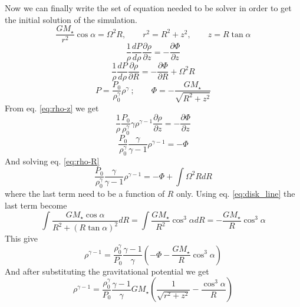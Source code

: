 \documentclass[12pt, a4paper]{article}
\begin{document}
Now we can finally write the set of equation needed to be solver in order to get the initial solution of the simulation.
\begin{equation}\label{eq:disk_line}
    \frac{G M_\star}{r^2}\cos\alpha = \Omega^2 R, \qquad r^2=R^2+z^2, \qquad z=R\tan\alpha
\end{equation}
\begin{equation}\label{eq:rho-z}
    \frac{1}{\rho}\frac{d P}{d \rho}\frac{\partial \rho}{\partial z} = -\frac{\partial \Phi}{\partial z}
\end{equation}
\begin{equation}\label{eq:rho-R}
    \frac{1}{\rho}\frac{d P}{d \rho}\frac{\partial \rho}{\partial R} = -\frac{\partial \Phi}{\partial R} + \Omega^2 R
\end{equation}
\begin{equation}
    P=\frac{P_0}{\rho_0^\gamma}\rho^\gamma ~;\qquad \Phi=-\frac{G M_\star}{\sqrt{R^2+z^2}} 
\end{equation}
From eq. \ref{eq:rho-z} we get
\begin{equation}
    \frac{1}{\rho}\frac{P_0}{\rho_0^\gamma}\gamma\rho^{\gamma-1}\frac{\partial \rho}{\partial z} = - \frac{\partial \Phi}{\partial z}
\end{equation}
\begin{equation}
    \frac{P_0}{\rho_0^\gamma}\frac{\gamma}{\gamma-1}\rho^{\gamma-1}=-\Phi
\end{equation}
And solving eq. \ref{eq:rho-R}
\begin{equation}
    \frac{P_0}{\rho_0^\gamma}\frac{\gamma}{\gamma-1}\rho^{\gamma-1}=-\Phi + \int \Omega^2 R dR
\end{equation}
where the last term need to be a function of $R$ only.
Using eq. \ref{eq:disk_line} the last term become
\begin{equation}
    \int \frac{G M_\star \cos\alpha}{R^2+(R\tan\alpha)^2} dR = 
    \int \frac{G M_\star}{R^2}\cos^3\alpha dR =
    -\frac{G M_\star}{R}\cos^3\alpha
\end{equation}
This give
\begin{equation}
    \rho^{\gamma-1}=\frac{\rho_0^\gamma}{P_0}\frac{\gamma-1}{\gamma}\left( -\Phi -\frac{G M_\star}{R}\cos^3\alpha \right) 
\end{equation}
And after substituting the gravitational potential we get
\begin{equation}\label{eq:rho_solution}
    \boxed{
        \rho^{\gamma-1}=\frac{\rho_0^\gamma}{P_0}\frac{\gamma-1}{\gamma} G M_\star \left( \frac{1}{\sqrt{r^2+z^2}} -\frac{\cos^3\alpha}{R} \right)
    }
\end{equation}
\end{document}

